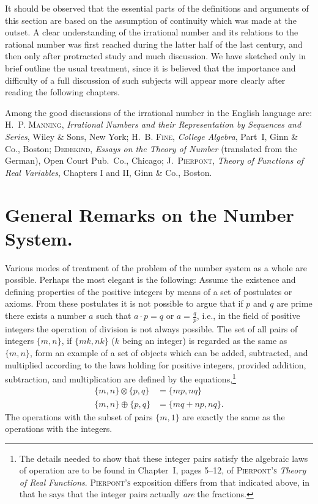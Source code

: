 \documentclass[a4paper,12pt]{book}[2004/02/16]
\providecommand{\colorbox}[2]{#2}
\newcommand{\correction}[2]{\colorbox{corr}{#1}}
\providecommand{\hypertarget}[2]{#2}
\theoremstyle{ilemma}
\theoremstyle{itheorem}
\theoremstyle{iother}
\theoremstyle{icorollary}
\theoremstyle{numcorollary}
\theoremstyle{idefinition}
\begin{document}
It should be observed that the essential parts of the definitions and
arguments of this section are based on the assumption of continuity
which was made at the outset. A clear understanding of the irrational
number and its relations to the rational number was first reached
during the latter half of the last century, and then only after
protracted study and much discussion. We have sketched only in brief
outline the usual treatment, since it is believed that the importance
and difficulty of a full discussion of such subjects will appear more
clearly after reading the following chapters.

Among the good discussions of the irrational number in the English
language are: \textsc{H.~P. Manning}, \textit{Irrational Numbers and
their Representation by Sequences and Series}, Wiley \& Sons, New
York; \textsc{H.~B. Fine}, \textit{College Algebra}, Part~I, Ginn \&
Co., Boston;
\textsc{Dedekind}, \textit{Essays on the Theory of Number} (translated
from the German), Open Court Pub.\ Co., Chicago; \textsc{J.~Pierpont},
\textit{Theory of Functions of Real Variables}, Chapters I and II,
Ginn \& Co., Boston.

\section{General Remarks on the Number System.}\hypertarget{chIsec4}{}%

Various modes of treatment of the problem of the number system as a
whole are possible. Perhaps the most elegant is the following: Assume
the existence and defining properties of the positive integers by
means of a set of postulates or axioms.  From these postulates it is
not possible to argue that if $p$ and $q$ are prime there exists a
number $a$ such that $a\cdot p=q$ or \correction{$a=\frac
qp$}{$a=\frac pq$}, i.e., in the field of positive integers the
operation of division is not always possible. The set of all pairs of
integers $\{m,n\}$, if $\{mk, nk\}$ ($k$ being an integer) is regarded
as the same as $\{m,n\}$, form an example of a set of objects which
can be added, subtracted, and multiplied according to the laws holding
for positive integers, provided addition, subtraction, and
multiplication are defined by the equations,\footnote{%
    The details needed to show that these integer pairs satisfy the
    algebraic laws of operation are to be found in Chapter~I, pages
    5--12, of \textsc{Pierpont's} \textit{Theory of Real
    Functions}. \textsc{Pierpont's} exposition differs from that
    indicated above, in that he says that the integer pairs actually
    \emph{are} the fractions.}
\begin{align*}
  \{m, n\}\otimes\{p, q\} &= \{mp, nq\} \\
  \{m, n\}\oplus \{p, q\} &= \{mq+np, nq\}.
\end{align*}
The operations with the subset of pairs $\{m,1\}$ are exactly the same
as the operations with the integers.
\end{document}
